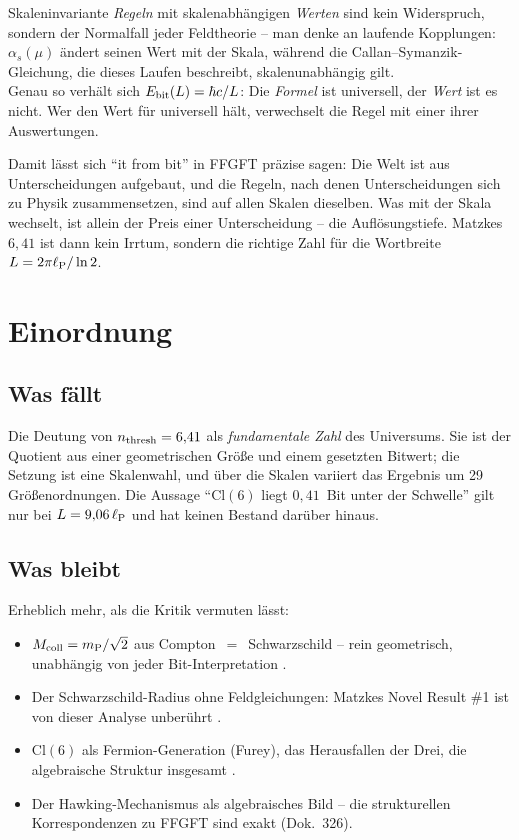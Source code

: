\begin{tcolorbox}[proofbox, title={Der eigentliche Befund}]
  Skaleninvariante \emph{Regeln} mit skalenabhängigen \emph{Werten} sind
  kein Widerspruch, sondern der Normalfall jeder Feldtheorie -- man denke
  an laufende Kopplungen: $\alpha_s(\mu)$ ändert seinen Wert mit der
  Skala, während die Callan--Symanzik-Gleichung, die dieses Laufen
  beschreibt, skalenunabhängig gilt.\\[4pt]
  Genau so verhält sich $E_{\mathrm{bit}}(L) = \hbar c/L$: Die \emph{Formel} ist
  universell, der \emph{Wert} ist es nicht. Wer den Wert für universell
  hält, verwechselt die Regel mit einer ihrer Auswertungen.
\end{tcolorbox}

Damit lässt sich \enquote{it from bit} in FFGFT präzise sagen:
Die Welt ist aus Unterscheidungen aufgebaut, und die Regeln, nach denen
Unterscheidungen sich zu Physik zusammensetzen, sind auf allen Skalen
dieselben. Was mit der Skala wechselt, ist allein der Preis einer
Unterscheidung -- die Auflösungstiefe. Matzkes $6{,}41$ ist dann kein
Irrtum, sondern die richtige Zahl für die Wortbreite
$L = 2\pi\ell_{\mathrm{P}}/\ln 2$.

\section{Einordnung}

\subsection{Was fällt}

Die Deutung von $n_{\mathrm{thresh}} = 6{,}41$ als \emph{fundamentale Zahl} des
Universums. Sie ist der Quotient aus einer geometrischen Größe und einem
gesetzten Bitwert; die Setzung ist eine Skalenwahl, und über die Skalen
variiert das Ergebnis um 29 Größenordnungen. Die Aussage
\enquote{$\mathrm{Cl}(6)$ liegt $0{,}41$~Bit unter der Schwelle}
gilt nur bei $L = 9{,}06\,\ell_{\mathrm{P}}$ und hat keinen Bestand darüber hinaus. \X

\subsection{Was bleibt}

Erheblich mehr, als die Kritik vermuten lässt:

\begin{itemize}
  \item $M_{\mathrm{coll}} = m_{\mathrm{P}}/\sqrt{2}$ aus Compton~$=$~Schwarzschild -- rein
    geometrisch, unabhängig von jeder Bit-Interpretation \B.
  \item Der Schwarzschild-Radius ohne Feldgleichungen: Matzkes
    Novel Result \#1 ist von dieser Analyse unberührt \B.
  \item $\mathrm{Cl}(6)$ als Fermion-Generation (Furey), das
    Herausfallen der Drei, die algebraische Struktur insgesamt \B.
  \item Der Hawking-Mechanismus als algebraisches Bild -- die
    strukturellen Korrespondenzen zu FFGFT sind exakt (Dok.~326).
\end{itemize}

